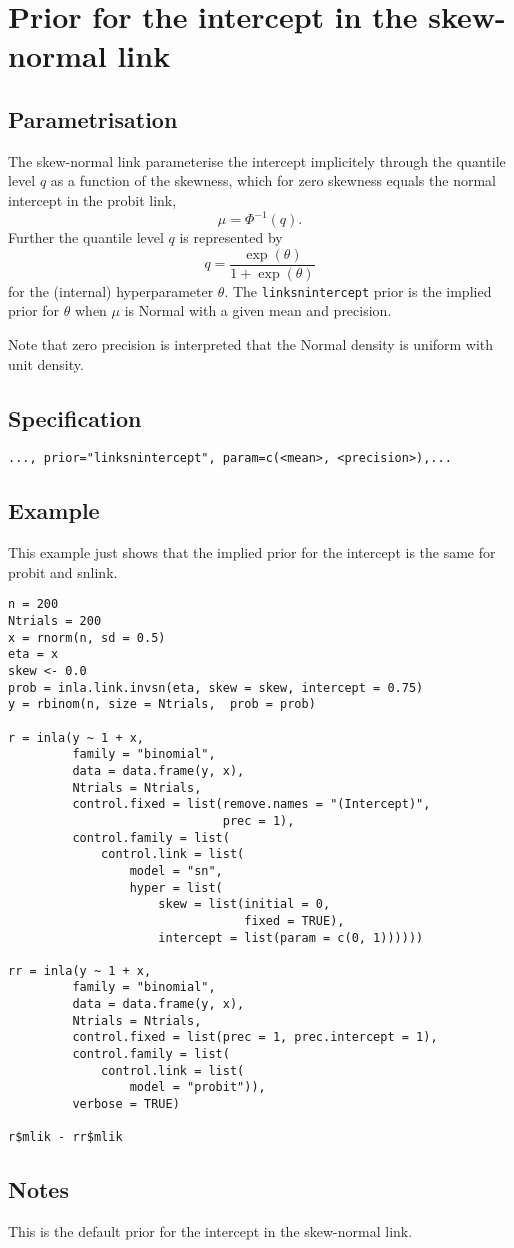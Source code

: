 \documentclass[a4paper,11pt]{article}
\begin{document}
\section*{Prior for the intercept in the skew-normal link}

\subsection*{Parametrisation}
The skew-normal link parameterise the intercept implicitely through
the quantile level $q$ as a function of the skewness, which for zero
skewness equals the normal intercept in the probit link,
\begin{equation}
    \mu = \Phi^{-1}(q).
\end{equation}
Further the quantile level $q$ is represented by 
\begin{equation}
    q = \frac{\exp(\theta)}{1+\exp(\theta)}
\end{equation}
for the (internal) hyperparameter $\theta$. The
\texttt{linksnintercept} prior is the implied prior for $\theta$ when
$\mu$ is Normal with a given mean and precision.

Note that zero precision is interpreted that the Normal density is
uniform with unit density.

\subsection*{Specification}
\begin{center}
    \texttt{..., prior="linksnintercept", param=c(<mean>, <precision>),...}
\end{center}

\subsection*{Example}

This example just shows that the implied prior for the intercept is
the same for probit and snlink.

\begin{verbatim}
n = 200
Ntrials = 200
x = rnorm(n, sd = 0.5)
eta = x
skew <- 0.0
prob = inla.link.invsn(eta, skew = skew, intercept = 0.75)
y = rbinom(n, size = Ntrials,  prob = prob)

r = inla(y ~ 1 + x,
         family = "binomial",
         data = data.frame(y, x),
         Ntrials = Ntrials,
         control.fixed = list(remove.names = "(Intercept)",
                              prec = 1), 
         control.family = list(
             control.link = list(
                 model = "sn",
                 hyper = list(
                     skew = list(initial = 0,
                                 fixed = TRUE),
                     intercept = list(param = c(0, 1))))))

rr = inla(y ~ 1 + x,
         family = "binomial",
         data = data.frame(y, x),
         Ntrials = Ntrials,
         control.fixed = list(prec = 1, prec.intercept = 1), 
         control.family = list(
             control.link = list(
                 model = "probit")), 
         verbose = TRUE)

r$mlik - rr$mlik
\end{verbatim}


\subsection*{Notes}

This is the default prior for the intercept in the skew-normal link. 
\end{document}
